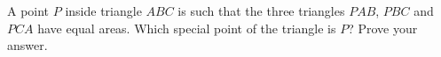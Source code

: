A point $P$ inside triangle $ABC$ is such that the three triangles $PAB$, $PBC$ and $PCA$ have equal areas. Which special point of the triangle is $P$? Prove your answer.
